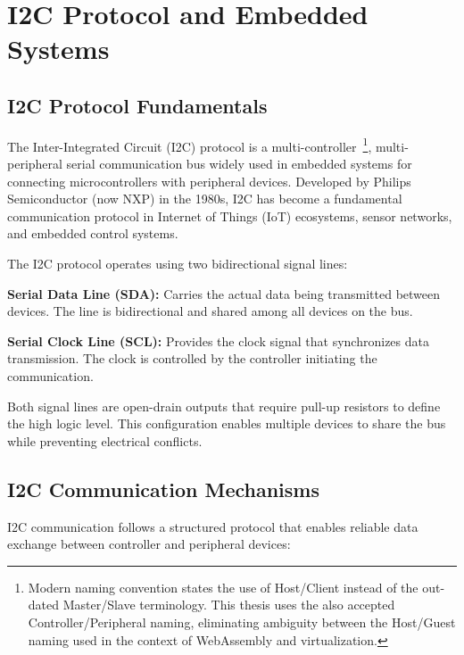 \section{I2C Protocol and Embedded Systems}
\label{sec:i2c-embedded}

\subsection{I2C Protocol Fundamentals}
\label{subsec:i2c-fundamentals}

The Inter-Integrated Circuit (I2C) protocol is a multi-controller~\footnote{Modern naming convention states the use of Host/Client instead of the out-dated Master/Slave terminology. This thesis uses the also accepted Controller/Peripheral naming, eliminating ambiguity between the Host/Guest naming used in the context of WebAssembly and virtualization.}, multi-peripheral serial communication bus widely used in embedded systems for connecting microcontrollers with peripheral devices\cite{i2c_specification}. Developed by Philips Semiconductor (now NXP) in the 1980s, I2C has become a fundamental communication protocol in Internet of Things (IoT) ecosystems, sensor networks, and embedded control systems.


The I2C protocol operates using two bidirectional signal lines:

\textbf{Serial Data Line (SDA):} Carries the actual data being transmitted between devices. The line is bidirectional and shared among all devices on the bus.

\textbf{Serial Clock Line (SCL):} Provides the clock signal that synchronizes data transmission. The clock is controlled by the controller initiating the communication.

Both signal lines are open-drain outputs that require pull-up resistors to define the high logic level. This configuration enables multiple devices to share the bus while preventing electrical conflicts.

\subsection{I2C Communication Mechanisms}
\label{subsec:i2c-communication}

I2C communication follows a structured protocol that enables reliable data exchange between controller and peripheral devices:

